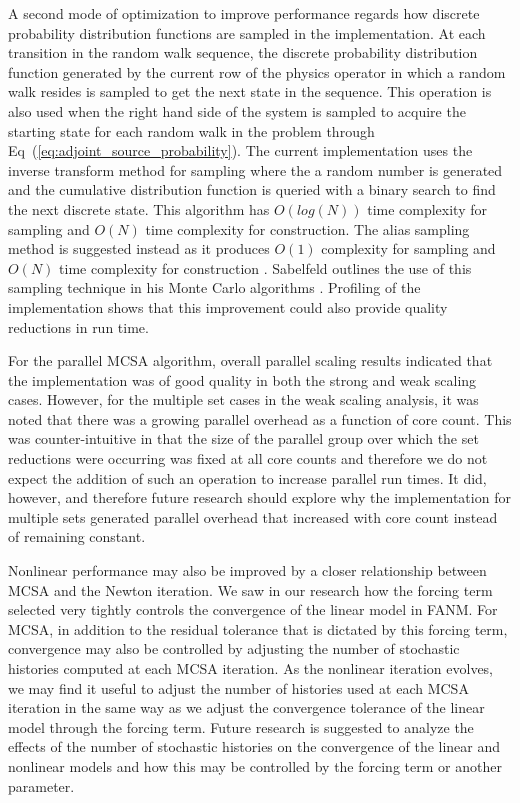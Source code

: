 A second mode of optimization to improve performance regards how
discrete probability distribution functions are sampled in the
implementation. At each transition in the random walk sequence, the
discrete probability distribution function generated by the current
row of the physics operator in which a random walk resides is sampled
to get the next state in the sequence. This operation is also used
when the right hand side of the system is sampled to acquire the
starting state for each random walk in the problem through
Eq~(\ref{eq:adjoint_source_probability}). The current implementation
uses the inverse transform method for sampling where the a random
number is generated and the cumulative distribution function is
queried with a binary search to find the next discrete state. This
algorithm has $O(log(N))$ time complexity for sampling and $O(N)$ time
complexity for construction. The alias sampling method is suggested
instead as it produces $O(1)$ complexity for sampling and $O(N)$ time
complexity for construction \cite{smith_analysis_2005}. Sabelfeld
outlines the use of this sampling technique in his Monte Carlo
algorithms \cite{sabelfeld_sparsified_2009}. Profiling of the
implementation shows that this improvement could also provide quality
reductions in run time.

For the parallel MCSA algorithm, overall parallel scaling results
indicated that the implementation was of good quality in both the
strong and weak scaling cases. However, for the multiple set cases in
the weak scaling analysis, it was noted that there was a growing
parallel overhead as a function of core count. This was
counter-intuitive in that the size of the parallel group over which
the set reductions were occurring was fixed at all core counts and
therefore we do not expect the addition of such an operation to
increase parallel run times. It did, however, and therefore future
research should explore why the implementation for multiple sets
generated parallel overhead that increased with core count instead of
remaining constant.

Nonlinear performance may also be improved by a closer relationship
between MCSA and the Newton iteration. We saw in our research how the
forcing term selected very tightly controls the convergence of the
linear model in FANM. For MCSA, in addition to the residual tolerance
that is dictated by this forcing term, convergence may also be
controlled by adjusting the number of stochastic histories computed at
each MCSA iteration. As the nonlinear iteration evolves, we may find
it useful to adjust the number of histories used at each MCSA
iteration in the same way as we adjust the convergence tolerance of
the linear model through the forcing term. Future research is
suggested to analyze the effects of the number of stochastic histories
on the convergence of the linear and nonlinear models and how this may
be controlled by the forcing term or another parameter.

